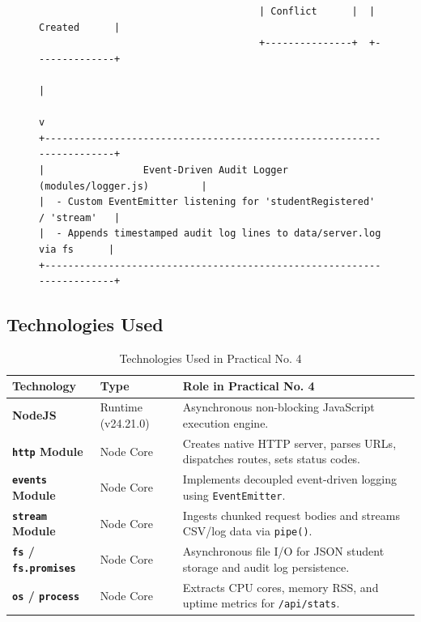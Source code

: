 \documentclass[11pt,a4paper]{article}
\begin{document}
\begin{figure}[htbp]
\begin{tcolorbox}[colback=codebg,colframe=collegeblue,arc=2mm,title=\textbf{Figure 1: NodeJS Server Architecture and Stream Data Flow}]
\begin{verbatim}
                                      | Conflict      |  | Created      |
                                      +---------------+  +--------------+
                                                               |
                                                               v
+-----------------------------------------------------------------------+
|                 Event-Driven Audit Logger (modules/logger.js)         |
|  - Custom EventEmitter listening for 'studentRegistered' / 'stream'   |
|  - Appends timestamped audit log lines to data/server.log via fs      |
+-----------------------------------------------------------------------+
\end{verbatim}
\end{tcolorbox}
\end{figure}

\subsection{Technologies Used}
\begin{table}[htbp]
\centering
\small
\renewcommand{\arraystretch}{1.3}
\begin{tabularx}{\textwidth}{l p{3.2cm} X}
\toprule
\textbf{Technology} & \textbf{Type} & \textbf{Role in Practical No. 4} \\
\midrule
\textbf{NodeJS} & Runtime (v24.21.0) & Asynchronous non-blocking JavaScript execution engine. \\
\textbf{\texttt{http} Module} & Node Core & Creates native HTTP server, parses URLs, dispatches routes, sets status codes. \\
\textbf{\texttt{events} Module} & Node Core & Implements decoupled event-driven logging using \texttt{EventEmitter}. \\
\textbf{\texttt{stream} Module} & Node Core & Ingests chunked request bodies and streams CSV/log data via \texttt{pipe()}. \\
\textbf{\texttt{fs} / \texttt{fs.promises}} & Node Core & Asynchronous file I/O for JSON student storage and audit log persistence. \\
\textbf{\texttt{os} / \texttt{process}} & Node Core & Extracts CPU cores, memory RSS, and uptime metrics for \texttt{/api/stats}. \\
\bottomrule
\end{tabularx}
\caption{Technologies Used in Practical No. 4}
\end{table}

\newpage
\end{document}

